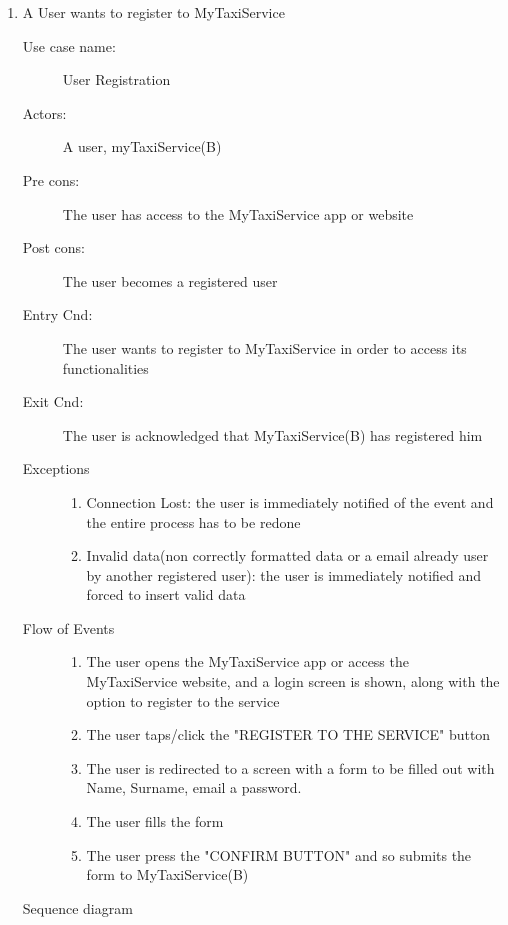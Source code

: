 \documentclass[11pt,titlepage]{article} %
\begin{document}
\begin{enumerate}
	       \item A User wants to register to MyTaxiService
		\begin{description}
		        \item [Use case name:] User Registration
		        \item [Actors:] A user, myTaxiService(B)
		        \item [Pre cons:] The user has access to the MyTaxiService app or website
		        \item [Post cons:] The user becomes a registered user
		        \item [Entry Cnd:] The user wants to register to MyTaxiService in order
		        to access its functionalities
		        \item [Exit Cnd:] The user is acknowledged that MyTaxiService(B) has registered him
		        \item [Exceptions]\hfill
			\begin{enumerate}
			          \item Connection Lost: the user is immediately notified of the event and the entire process
			          has to be redone
			          \item Invalid data(non correctly formatted data or a email already
			          user by another registered user): the user is immediately notified and forced to insert valid data
			\end{enumerate}
		        \item [Flow of Events]\hfill
			\begin{enumerate}
			          \item The user opens the MyTaxiService app or access the MyTaxiService website, and a login
			            screen is shown, along with the option to register to the service
			          \item The user taps/click the "REGISTER TO THE SERVICE" button
			          \item The user is redirected to a screen with a form to be filled out with Name, Surname, email a password.
			          \item The user fills the form
			          \item The user press the "CONFIRM BUTTON" and so submits the form to MyTaxiService(B)
			\end{enumerate}
		\end{description}
		Sequence diagram
		\begin{center}

\end{center}
\end{enumerate}
\end{document}
